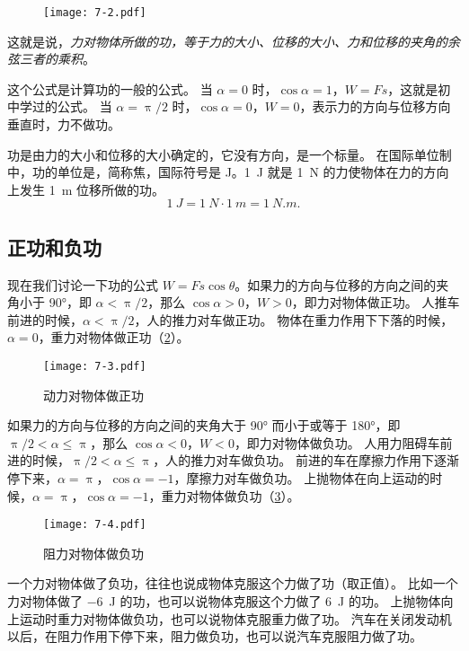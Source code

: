 \begin{figure}
  \texttt{[image: 7-2.pdf]}
  \caption{}\label{fig:7-2}
\end{figure}

这就是说，\emph{力对物体所做的功，等于力的大小、位移的大小、力和位移的夹角的余弦三者的乘积}。

这个公式是计算功的一般的公式。
当 $\alpha=0$ 时，$\cos\alpha=1$，$W=Fs$，这就是初中学过的公式。
当 $\alpha=\uppi/2$ 时，$\cos\alpha=0$，$W=0$，表示力的方向与位移方向垂直时，力不做功。

功是由力的大小和位移的大小确定的，它没有方向，是一个标量。
在国际单位制中，功的单位是，简称焦，国际符号是 \unit{J}。\qty{1}{J} 就是 \qty{1}{N} 的力使物体在力的方向上发生 \qty{1}{m} 位移所做的功。
\[ \qty{1}{J}=\qty{1}{N} \cdot \qty{1}{m}=\qty{1}{N.m}.\]

\subsection{正功和负功} 

现在我们讨论一下功的公式 $W=Fs\cos\theta$。如果力的方向与位移的方向之间的夹角小于 \ang{90}，即 $\alpha<\uppi/2$，那么 $\cos\alpha>0$，$W>0$，即力对物体做正功。
人推车前进的时候，$\alpha<\uppi/2$，人的推力对车做正功。
物体在重力作用下下落的时候，$\alpha=0$，重力对物体做正功（\cref{fig:7-3}）。
\begin{figure}
  \texttt{[image: 7-3.pdf]}
\caption{动力对物体做正功}\label{fig:7-3}
\end{figure}

如果力的方向与位移的方向之间的夹角大于 \ang{90} 而小于或等于 \ang{180}，即 $\uppi/2<\alpha\leqslant \uppi$，那么 $\cos\alpha <0$，$W<0$，即力对物体做负功。
人用力阻碍车前进的时候，$\uppi/2<\alpha\leqslant \uppi$，人的推力对车做负功。
前进的车在摩擦力作用下逐渐停下来，$\alpha=\uppi$，$\cos\alpha=-1$，摩擦力对车做负功。
上抛物体在向上运动的时候，$\alpha=\uppi$，$\cos\alpha=-1$，重力对物体做负功（\cref{fig:7-4}）。
\begin{figure}
  \texttt{[image: 7-4.pdf]}
  \caption{阻力对物体做负功}\label{fig:7-4}
\end{figure}

一个力对物体做了负功，往往也说成物体克服这个力做了功（取正值）。
比如一个力对物体做了 \qty{-6}{J} 的功，也可以说物体克服这个力做了 \qty{6}{J} 的功。
上抛物体向上运动时重力对物体做负功，也可以说物体克服重力做了功。
汽车在关闭发动机以后，在阻力作用下停下来，阻力做负功，也可以说汽车克服阻力做了功。

